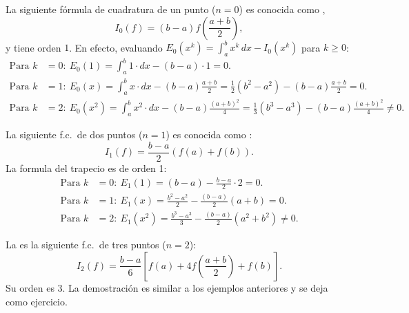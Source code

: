 \begin{example}
  \label{ex:formula-punto-medio}
  La siguiente fórmula de cuadratura de un punto ($n=0$) es conocida
  como ,
  \begin{equation}
    \label{eq:f.c.-pto-medio}
    I_0(f)= (b-a) f\left(\frac{a+b}{2}\right),
  \end{equation}
  y tiene orden $1$. En efecto, evaluando $E_0(x^k)=\int_a^b
  x^k\, dx-I_0(x^k)$ para $k\ge 0$:
  \begin{align*}
   \text{Para } k&=0:\ E_0(1) = \int_a^b 1\cdot dx - (b-a)\cdot 1 = 0.
   \\
   \text{Para } k&=1:\ E_0(x) = \int_a^b x\cdot dx - (b-a)\frac{a+b}{2}
   = \frac{1}{2}(b^2-a^2) -  (b-a) \frac{a+b}{2} = 0.
   \\
   \text{Para } k&=2:\ E_0(x^2) = \int_a^b x^2\cdot dx
   - (b-a) \frac{(a+b)^2}{4}
   = \frac{1}{3}(b^3-a^3) - (b-a)\frac{(a+b)^2}{4}
   \neq 0.
  \end{align*}
\end{example}

\begin{example}
  \label{ex:formula-trapecio}
  La siguiente f.c.\ de dos puntos ($n=1$) es conocida
  como :
  \begin{equation*}
    I_1(f)= \frac{b-a}{2}\left(f(a)+f(b)\right).
  \end{equation*}
  La formula del trapecio es de orden 1:
  \begin{align*}
    \text{Para } k&=0:\ E_1(1) = (b-a) - \frac{b-a}2\cdot 2 = 0.
    \\
    \text{Para } k&=1:\ E_1(x) = \frac{b^2-a^2}{2} -
    \frac{(b-a)}{2}(a+b) = 0.
    \\
    \text{Para } k&=2:\ E_1(x^2) = \frac{b^3-a^3}{3} -
    \frac{(b-a)}{2}(a^2+b^2) \neq 0.
  \end{align*}
\end{example}

\begin{example}
  \label{ex:formula-simpson}
  La  es la siguiente f.c.\
  de tres puntos ($n=2$):
  \begin{equation}
    I_2(f)= \frac{b-a}{6}\left[f(a)+4f
      \left(\frac{a+b}{2}\right)+f(b)\right].
    \label{eq:formula-simpson}
  \end{equation}
  Su orden es $3$. La demostración es similar a los ejemplos anteriores y se deja como ejercicio.
\end{example}

